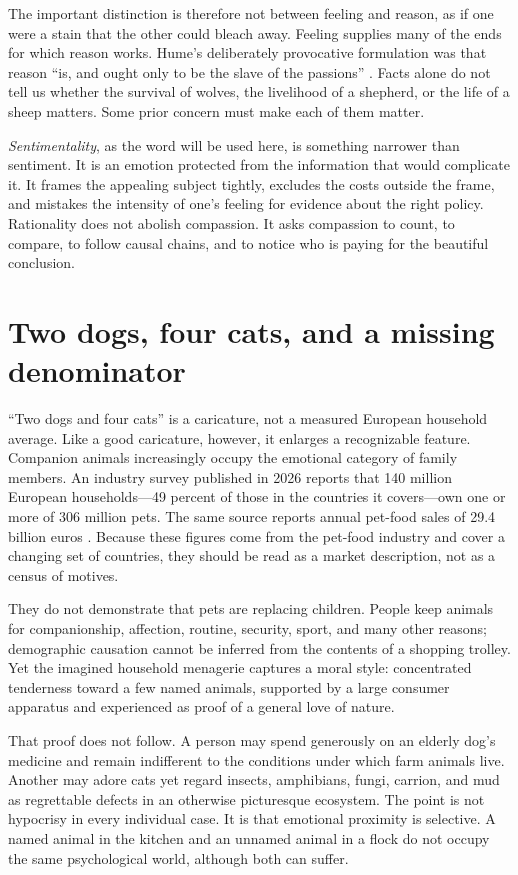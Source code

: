 ﻿\documentclass[12pt,a4paper]{book}
\begin{document}
The important distinction is therefore not between feeling and reason, as if
one were a stain that the other could bleach away.  Feeling supplies many of
the ends for which reason works.  Hume's deliberately provocative formulation
was that reason ``is, and ought only to be the slave of the passions''
\cite[Book~II, Part~III, sec.~3]{Hume-Treatise}.  Facts alone do not tell us
whether the survival of wolves, the livelihood of a shepherd, or the life of a
sheep matters.  Some prior concern must make each of them matter.

\emph{Sentimentality}, as the word will be used here, is something narrower
than sentiment.  It is an emotion protected from the information that would
complicate it.  It frames the appealing subject tightly, excludes the costs
outside the frame, and mistakes the intensity of one's feeling for evidence
about the right policy.  Rationality does not abolish compassion.  It asks
compassion to count, to compare, to follow causal chains, and to notice who is
paying for the beautiful conclusion.

\section{Two dogs, four cats, and a missing denominator}

``Two dogs and four cats'' is a caricature, not a measured European household
average.  Like a good caricature, however, it enlarges a recognizable feature.
Companion animals increasingly occupy the emotional category of family
members.  An industry survey published in 2026 reports that 140 million
European households---49 percent of those in the countries it covers---own
one or more of 306 million pets.  The same source reports annual pet-food
sales of 29.4 billion euros \cite{FEDIAFStatistics2026}.  Because these figures
come from the pet-food industry and cover a changing set of countries, they
should be read as a market description, not as a census of motives.

They do not demonstrate that pets are replacing children.  People keep
animals for companionship, affection, routine, security, sport, and many
other reasons; demographic causation cannot be inferred from the contents of
a shopping trolley.  Yet the imagined household menagerie captures a moral
style: concentrated tenderness toward a few named animals, supported by a
large consumer apparatus and experienced as proof of a general love of
nature.

That proof does not follow.  A person may spend generously on an elderly dog's
medicine and remain indifferent to the conditions under which farm animals
live.  Another may adore cats yet regard insects, amphibians, fungi, carrion,
and mud as regrettable defects in an otherwise picturesque ecosystem.  The
point is not hypocrisy in every individual case.  It is that emotional
proximity is selective.  A named animal in the kitchen and an unnamed animal
in a flock do not occupy the same psychological world, although both can
suffer.
\end{document}
